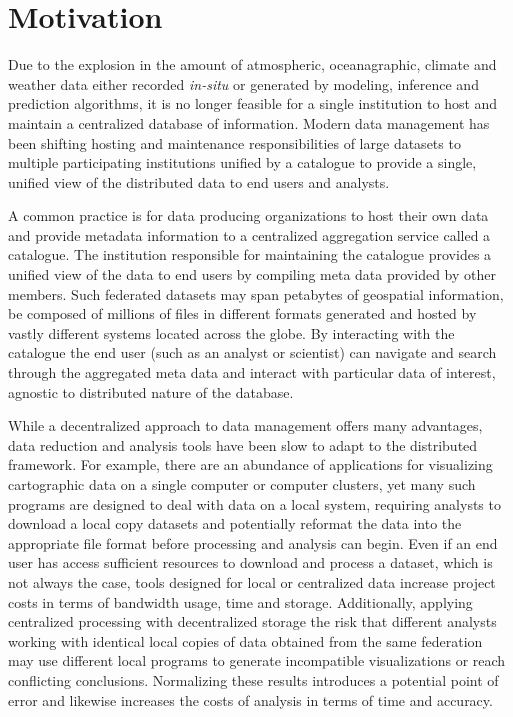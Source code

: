 \section{Motivation}
\label{sec:motivation}
Due to the explosion in the amount of atmospheric, oceanagraphic,
climate and weather data either recorded \emph{in-situ} or generated
by modeling, inference and prediction algorithms, it is no longer
feasible for a single institution to host and maintain a centralized
database of information. Modern data management has been shifting
hosting and maintenance responsibilities of large datasets to multiple
participating institutions unified by a catalogue to provide a single,
unified view of the distributed data to end users and analysts.

A common practice is for data producing organizations to host their
own data and provide metadata information to a centralized aggregation
service called a catalogue. The institution responsible for
maintaining the catalogue provides a unified view of the data to end
users by compiling meta data provided by other members. Such federated
datasets may span petabytes of geospatial information, be composed of
millions of files in different formats generated and hosted by vastly
different systems located across the globe. By interacting with the
catalogue the end user (such as an analyst or scientist) can navigate
and search through the aggregated meta data and interact with
particular data of interest, agnostic to distributed nature of the
database.

While a decentralized approach to data management offers many
advantages, data reduction and analysis tools have been slow to adapt
to the distributed framework. For example, there are an abundance of
applications for visualizing cartographic data on a single computer or
computer clusters, yet many such programs are designed to deal with
data on a local system, requiring analysts to download a local copy
datasets and potentially reformat the data into the appropriate file
format before processing and analysis can begin. Even if an end user
has access sufficient resources to download and process a dataset,
which is not always the case, tools designed for local or centralized
data increase project costs in terms of bandwidth usage, time and
storage. Additionally, applying centralized processing with
decentralized storage the risk that different analysts working with
identical local copies of data obtained from the same federation may
use different local programs to generate incompatible visualizations
or reach conflicting conclusions. Normalizing these results introduces
a potential point of error and likewise increases the costs of
analysis in terms of time and accuracy.

